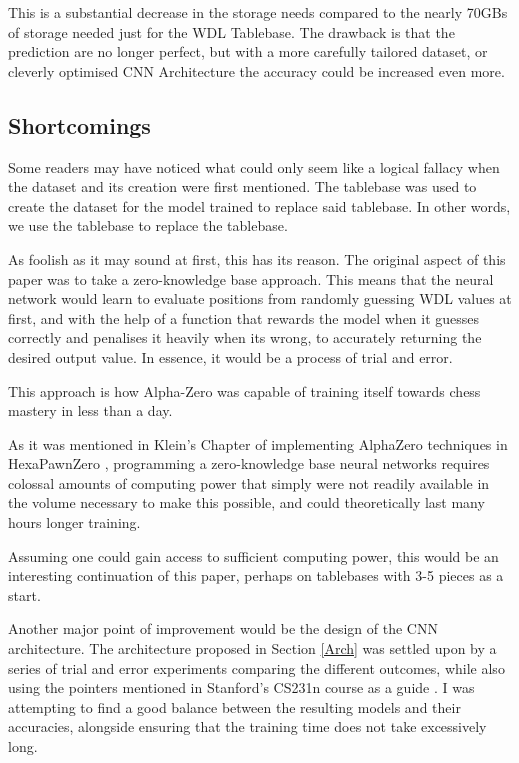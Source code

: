 This is a substantial decrease in the storage needs compared to the nearly 70GBs of storage needed just for the WDL Tablebase. The drawback is that the prediction are no longer perfect, but with a more carefully tailored dataset, or cleverly optimised CNN Architecture the accuracy could be increased even more.

\subsection{Shortcomings}
Some readers may have noticed what could only seem like a logical fallacy when the dataset and its creation were first mentioned. The tablebase was used to create the dataset for the model trained to replace said tablebase. In other words, we use the tablebase to replace the tablebase.

As foolish as it may sound at first, this has its reason. The original aspect of this paper was to take a zero-knowledge base approach. This means that the neural network would learn to evaluate positions from randomly guessing WDL values at first, and with the help of a function that rewards the model when it guesses correctly and penalises it heavily when its wrong, to accurately returning the desired output value. In essence, it would be a process of trial and error.

This approach is how Alpha-Zero \cite{AlphaZero} was capable of training itself towards chess mastery in less than a day.

As it was mentioned in Klein's Chapter of implementing AlphaZero techniques in HexaPawnZero \cite{Klein}, programming a zero-knowledge base neural networks requires colossal amounts of computing power that simply were not readily available in the volume necessary to make this possible, and could theoretically last many hours longer training.

Assuming one could gain access to sufficient computing power, this would be an interesting continuation of this paper, perhaps on tablebases with 3-5 pieces as a start.

Another major point of improvement would be the design of the CNN architecture. The architecture proposed in Section \ref{Arch} was settled upon by a series of trial and error experiments comparing the different outcomes, while also using the pointers mentioned in Stanford's CS231n course as a guide \cite{cs231n}. I was attempting to find a good balance between the resulting models and their accuracies, alongside ensuring that the training time does not take excessively long.

